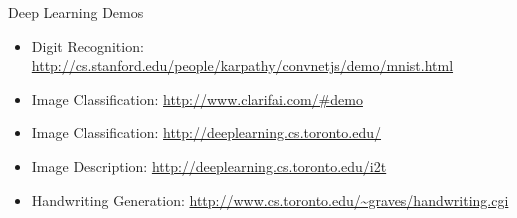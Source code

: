 \documentclass[serif,xcolor=pdftex,dvipsnames,table,hyperref={bookmarks=false}]{beamer}
\begin{document}
\begin{frame}[t]{Deep Learning Demos}

\begin{itemize}
\setlength{\itemsep}{8pt}

\item Digit Recognition: \url{http://cs.stanford.edu/people/karpathy/convnetjs/demo/mnist.html}

\item Image Classification: \url{http://www.clarifai.com/\#demo}

\item Image Classification: \url{http://deeplearning.cs.toronto.edu/}

\item Image Description: \url{http://deeplearning.cs.toronto.edu/i2t}

\item Handwriting Generation: \url{http://www.cs.toronto.edu/\~graves/handwriting.cgi}

\end{itemize}

\end{frame}
\end{document}
